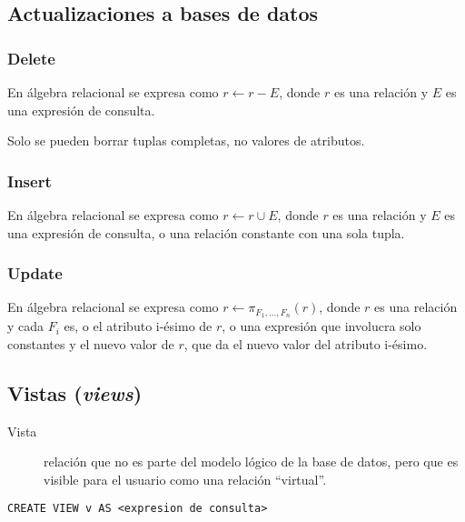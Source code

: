 \documentclass[a4paper, twoside]{article}
\begin{document}
\subsection{Actualizaciones a bases de datos}


\subsubsection{Delete}

En álgebra relacional se expresa como $r\leftarrow r-E$, donde $r$
es una relación y $E$ es una expresión de consulta.

Solo se pueden borrar tuplas completas, no valores de atributos.


\subsubsection{Insert}

En álgebra relacional se expresa como $r\leftarrow r\cup E$, donde
$r$ es una relación y $E$ es una expresión de consulta, o una relación
constante con una sola tupla.


\subsubsection{Update}

En álgebra relacional se expresa como $r\leftarrow\pi_{F_{1},\dots,F_{n}}(r)$,
donde $r$ es una relación y cada $F_{i}$ es, o el atributo i-ésimo
de $r$, o una expresión que involucra solo constantes y el nuevo
valor de $r$, que da el nuevo valor del atributo i-ésimo.


\subsection{Vistas (\emph{views})}
\begin{description}
\item [{Vista}] relación que no es parte del modelo lógico de la base de
datos, pero que es visible para el usuario como una relación ``virtual''.
\end{description}
\begin{lstlisting}
CREATE VIEW v AS <expresion de consulta>
\end{lstlisting}
\end{document}
